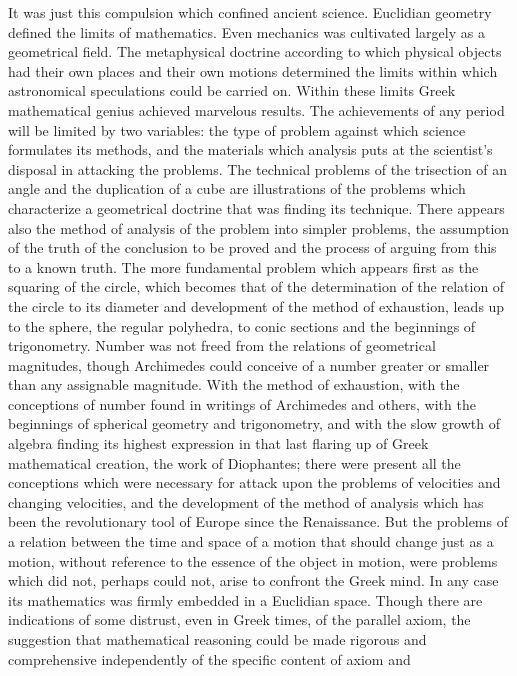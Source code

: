 \documentclass[12pt]{article}
\begin{document}
It was just this compulsion which confined ancient
science. Euclidian geometry defined the limits of
mathematics. Even mechanics was cultivated largely
as a geometrical field. The metaphysical doctrine
according to which physical objects had their own places
and their own motions determined the limits within
which astronomical speculations could be carried on.
Within these limits Greek mathematical genius achieved
marvelous results. The achievements of any period
will be limited by two variables: the type of problem
against which science formulates its methods, and the
materials which analysis puts at the scientist's disposal
in attacking the problems. The technical problems
of the trisection of an angle and the duplication
of a cube are illustrations of the problems which
characterize a geometrical doctrine that was finding
its technique. There appears also the method of analysis
of the problem into simpler problems, the
assumption of the truth of the conclusion to be proved
and the process of arguing from this to a known truth.
The more fundamental problem which appears first
as the squaring of the circle, which becomes that of
the determination of the relation of the circle to its
diameter and development of the method of exhaustion,
leads up to the sphere, the regular polyhedra, to conic
sections and the beginnings of trigonometry. Number
was not freed from the relations of geometrical magnitudes,
though Archimedes could conceive of a number
greater or smaller than any assignable magnitude.
With the method of exhaustion, with the conceptions
of number found in writings of Archimedes and others,
with the beginnings of spherical geometry and trigonometry,
and with the slow growth of algebra finding
its highest expression in that last flaring up of Greek
mathematical creation, the work of Diophantes; there
were present all the conceptions which were necessary
for attack upon the problems of velocities and changing
velocities, and the development of the method of
analysis which has been the revolutionary tool of Europe
since the Renaissance. But the problems of a
relation between the time and space of a motion that
should change just as a motion, without reference to
the essence of the object in motion, were problems
which did not, perhaps could not, arise to confront
the Greek mind. In any case its mathematics was firmly
embedded in a Euclidian space. Though there are
indications of some distrust, even in Greek times, of
the parallel axiom, the suggestion that mathematical
reasoning could be made rigorous and comprehensive
independently of the specific content of axiom and
\end{document}
